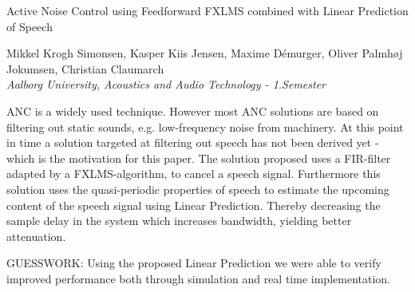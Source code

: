 
\begin{center}
\begin{huge}
Active Noise Control using Feedforward FXLMS combined with Linear Prediction of Speech
\end{huge}

\vspace{5mm}
Mikkel Krogh Simonsen, Kasper Kiis Jensen, Maxime Démurger, Oliver Palmhøj Jokumsen, Christian Claumarch
\\
\textit{Aalborg University, Acoustics and Audio Technology - 1.Semester}


\vspace{5mm}

ANC is a widely used technique. However most ANC solutions are based on filtering out static sounds, e.g. low-frequency noise from machinery. At this point in time a solution targeted at filtering out speech has not been derived yet - which is the motivation for this paper.
The solution proposed uses a FIR-filter adapted by a FXLMS-algorithm, to cancel a speech signal. Furthermore this solution uses the quasi-periodic properties of speech to estimate the upcoming content of the speech signal using Linear Prediction. Thereby decreasing the sample delay in the system which increases bandwidth, yielding better attenuation.




GUESSWORK: Using the proposed Linear Prediction we were able to verify improved performance both through simulation and real time implementation.












\end{center}
